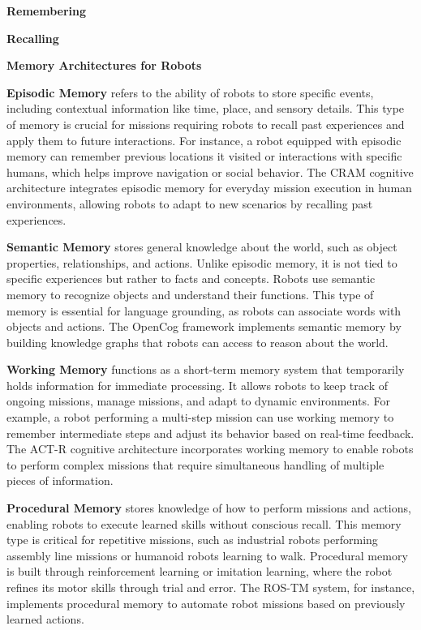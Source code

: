 \documentclass{book}
\providecommand{\ProjectDeepHeading}[2]{%
    \par\medskip\noindent\textbf{#2}\par\smallskip
}
\begin{document}
    \ProjectDeepHeading{6}{Remembering}

    \ProjectDeepHeading{6}{Recalling}




    \ProjectDeepHeading{6}{Memory Architectures for Robots}
        \textbf{Episodic Memory} refers to the ability of robots to store specific events, including contextual information like time, place, and sensory details. This type of memory is crucial for missions requiring robots to recall past experiences and apply them to future interactions. For instance, a robot equipped with episodic memory can remember previous locations it visited or interactions with specific humans, which helps improve navigation or social behavior. The CRAM cognitive architecture integrates episodic memory for everyday mission execution in human environments, allowing robots to adapt to new scenarios by recalling past experiences.
    
        \textbf{Semantic Memory} stores general knowledge about the world, such as object properties, relationships, and actions. Unlike episodic memory, it is not tied to specific experiences but rather to facts and concepts. Robots use semantic memory to recognize objects and understand their functions. This type of memory is essential for language grounding, as robots can associate words with objects and actions. The OpenCog framework implements semantic memory by building knowledge graphs that robots can access to reason about the world.
    
        \textbf{Working Memory} functions as a short-term memory system that temporarily holds information for immediate processing. It allows robots to keep track of ongoing missions, manage missions, and adapt to dynamic environments. For example, a robot performing a multi-step mission can use working memory to remember intermediate steps and adjust its behavior based on real-time feedback. The ACT-R cognitive architecture incorporates working memory to enable robots to perform complex missions that require simultaneous handling of multiple pieces of information.
    
        \textbf{Procedural Memory} stores knowledge of how to perform missions and actions, enabling robots to execute learned skills without conscious recall. This memory type is critical for repetitive missions, such as industrial robots performing assembly line missions or humanoid robots learning to walk. Procedural memory is built through reinforcement learning or imitation learning, where the robot refines its motor skills through trial and error. The ROS-TM system, for instance, implements procedural memory to automate robot missions based on previously learned actions.
    
\end{document}
